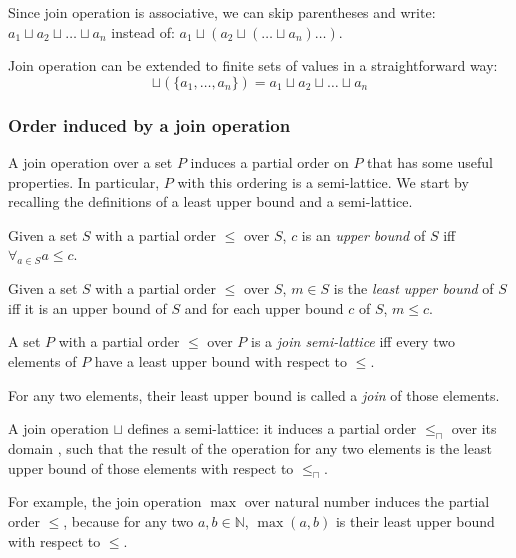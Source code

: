 Since join operation is associative, we can skip parentheses and write: $ a_1 \sqcup a_2 \sqcup \dots \sqcup a_n$ instead of: $ a_1 \sqcup (a_2 \sqcup ( \dots \sqcup a_n) \dots )$.

Join operation can be extended to finite sets of values in a straightforward way:
$$\sqcup(\{a_1, \dots, a_n \}) = a_1 \sqcup a_2 \sqcup \dots \sqcup a_n$$

\subsubsection{Order induced by a join operation}

A join operation over a set $P$ induces a partial order on $P$ that has some useful properties. In particular, $P$ with this ordering is a semi-lattice. We start by recalling the definitions of a least upper bound and a semi-lattice.

\begin{defn}
Given a set $S$ with a partial order $\le$ over $S$, $c$ is an \emph{upper bound} of $S$ iff $\forall_{a \in S} a \le c$.
\end{defn}

\begin{defn}
Given a set $S$ with a partial order $\le$ over $S$, $m \in S$ is the \emph{least upper bound} of $S$ iff it is an upper bound of $S$ and for each upper bound $c$ of $S$, $m \le c$.
\end{defn}

\begin{defn}
A set $P$ with a partial order $\le$ over $P$ is a \emph{join semi-lattice} iff every two elements of $P$ have a least upper bound with respect to $\le$.
\end{defn}

For any two elements, their least upper bound is called a \emph{join} of those elements.

A join operation $\sqcup$ defines a semi-lattice: it induces a partial order $\le_\sqcap$ over its domain , such that the result of the operation for any two elements is the least upper bound of those elements with respect to $\le_\sqcap$.

For example, the join operation $\max$ over natural number induces the partial order $\le$, because for any two $a, b \in \mathbb{N}$, $\max(a, b)$ is their least upper bound with respect to $\le$.

